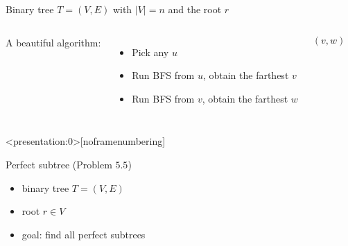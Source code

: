 \begin{frame}{}
  \centerline{Binary tree $T = (V, E)$ with $|V| = n$ and the root $r$}

  \pause
  \vspace{0.80cm}
  \centerline{}

  \pause
\end{frame}

\begin{frame}{}
  \centerline{}

  \pause
  \vspace{0.80cm}
  \begin{columns}
      {\large A beautiful algorithm:}
      \begin{itemize}
	\item Pick any $u$
	\item Run BFS from $u$, obtain the farthest $v$
	\item Run BFS from $v$, obtain the farthest $w$
      \end{itemize}
      \[
	(v, w)
      \]
    \pause
      \centerline{}
  \end{columns}

  \pause
  \vspace{0.50cm}
  \centerline{}
\end{frame}

\begin{frame}<presentation:0>[noframenumbering]
  \begin{exampleblock}{Perfect subtree (Problem $5.5$)}
    \begin{itemize}
      \item binary tree $T = (V, E)$
      \item root $r \in V$
      \item goal: find all perfect subtrees
    \end{itemize}
  \end{exampleblock}
\end{frame}

% 
